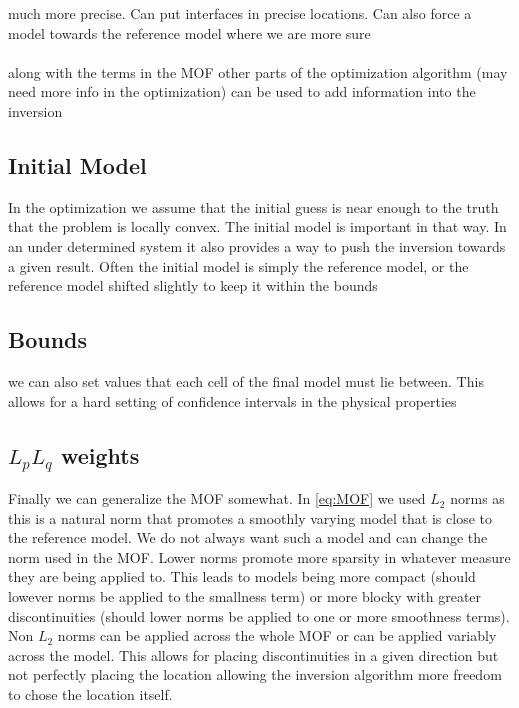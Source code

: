 much more precise. Can put interfaces in precise locations. Can also force a model towards the reference model where we are more sure
\\\\
along with the terms in the \ac{MOF} other parts of the optimization algorithm (may need more info in the optimization) can be used to add information into the inversion

\subsection{Initial Model}
\label{sec:Initial Model}

In the optimization we assume that the initial guess is near enough to the truth that the problem is locally convex. The initial model is important in that way. In an under determined system it also provides a way to push the inversion towards a given result. Often the initial model is simply the reference model, or the reference model shifted slightly to keep it within the bounds

\subsection{Bounds}
\label{sec:Bounds}

we can also set values that each cell of the final model must lie between. This allows for a hard setting of confidence intervals in the physical properties

\subsection{$L_p L_q$ weights}
\label{sec:Lp Lq weights}

Finally we can generalize the \ac{MOF} somewhat. In \autoref{eq:MOF} we used $L_2$ norms as this is a natural norm that promotes a smoothly varying model that is close to the reference model. We do not always want such a model and can change the norm used in the \ac{MOF}. Lower norms promote more sparsity in whatever measure they are being applied to. This leads to models being more compact (should lowever norms be applied to the smallness term) or more blocky with greater discontinuities (should lower norms be applied to one or more smoothness terms). Non $L_2$ norms can be applied across the whole \ac{MOF} or can be applied variably across the model. This allows for placing discontinuities in a given direction but not perfectly placing the location allowing the inversion algorithm more freedom to chose the location itself.

